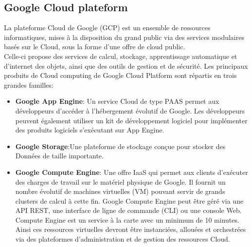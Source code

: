 \subsection{Google Cloud plateform}
La plateforme Cloud de Google (GCP) est un ensemble de ressources informatiques, mises à la disposition du grand public via des services modulaires basés sur le Cloud, sous la forme d'une offre de cloud public.\\
Celle-ci propose des services de calcul, stockage, apprentissage automatique et d'internet des objets, ainsi que des outils de gestion et de sécurité. Les principaux produits de Cloud computing de Google Cloud Platform sont répartis en trois grandes familles:
\begin{itemize}
	\item \textbf{Google App Engine}:  Un  service  Cloud  de  type  PAAS  permet  aux  développeurs 
	d'accéder  à  l'hébergement  évolutif  de  Google.  Les  développeurs  peuvent  également 
	utiliser  un  kit  de  développement  logiciel  pour  implémenter  des  produits  logiciels 
	s'exécutant  sur  App  Engine. 
	\item \textbf{Google Storage}:Une  plateforme  de  stockage   conçue  pour  stocker  des 
	Données de taille importante.
	
	\item \textbf{Google Compute Engine}: Une offre IaaS qui permet aux clients d'exécuter des charges de travail sur le matériel physique de Google.
Il fournit un nombre évolutif de machines virtuelles (VM) pouvant servir de grands clusters de calcul à cette fin.  Google Compute Engine peut être géré via une API REST, une interface de ligne de commande (CLI) ou une console Web. Compute Engine est un service à la carte avec un minimum de 10 minutes.\\
Ainsi ces ressources virtuelles devront être  instanciées, allouées et orchestrées via des plateformes d'administration et de gestion des ressources Cloud.
\end{itemize}

